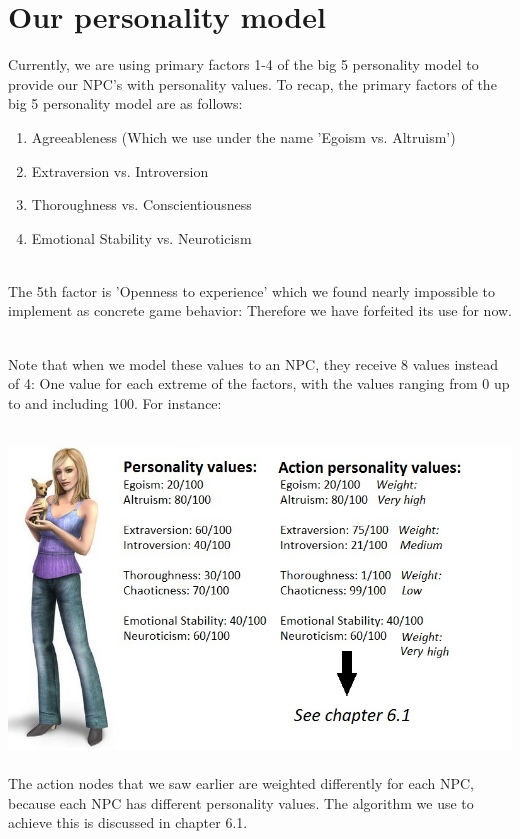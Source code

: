 \documentclass[11pt]{article} %
\begin{document}
\newpage
\section{Our personality model}
Currently, we are using primary factors 1-4 of the big 5 personality model to provide our NPC's with personality values. To recap, the primary factors of the big 5 personality model are as follows:

\begin{enumerate}
\item Agreeableness (Which we use under the name 'Egoism vs. Altruism')
\item Extraversion vs. Introversion
\item Thoroughness vs. Conscientiousness
\item Emotional Stability vs. Neuroticism
\end{enumerate}

~\\
The 5th factor is 'Openness to experience' which we found nearly impossible to implement as concrete game behavior: Therefore we have forfeited its use for now.

~\\
Note that when we model these values to an NPC, they receive 8 values instead of 4: One value for each extreme of the factors, with the values ranging from 0 up to and including 100.
For instance:

~\\
\includegraphics[scale=0.7]{sim}
~\\
The action nodes that we saw earlier are weighted differently for each NPC, because each NPC has different personality values. The algorithm we use to achieve this is discussed in chapter 6.1.

\newpage
\end{document}
